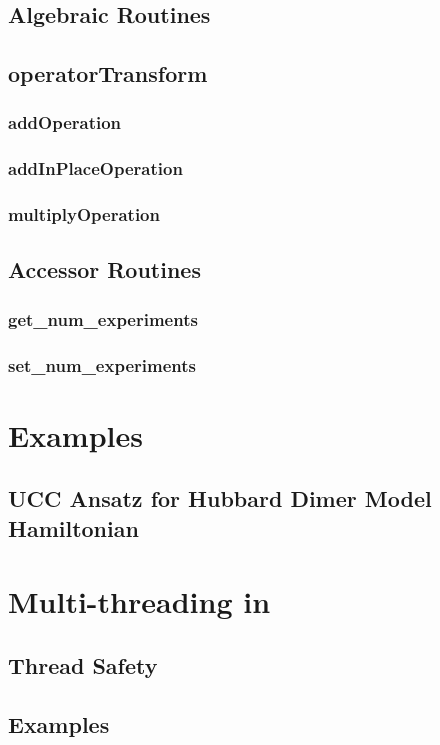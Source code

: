 \documentclass[10pt]{book}
\begin{document}
\subsection{Algebraic Routines}
\subsection{\textbf{operatorTransform}}\label{subsec:operatortransform}


\subsubsection{\textbf{addOperation}}\label{subsec:addop}


\subsubsection{\textbf{addInPlaceOperation}}\label{subsec:addinplaceop}


\subsubsection{\textbf{multiplyOperation}}\label{subsec:mulop}

 
 
\subsection{Accessor Routines}
\subsubsection{\textbf{get\_num\_experiments}}\label{subsec:getnumexp}


\subsubsection{\textbf{set\_num\_experiments}}\label{subsec:setnumexp}


\clearpage


\section{\qcor Examples}\label{sec:examples}

\subsection{UCC Ansatz for Hubbard Dimer Model Hamiltonian}\label{subsec:hubbard_dimer_ex}


\section{Multi-threading in \qcor}\label{sec:multi}
\subsection{Thread Safety}
\subsection{Examples}

\clearpage



\end{document}
